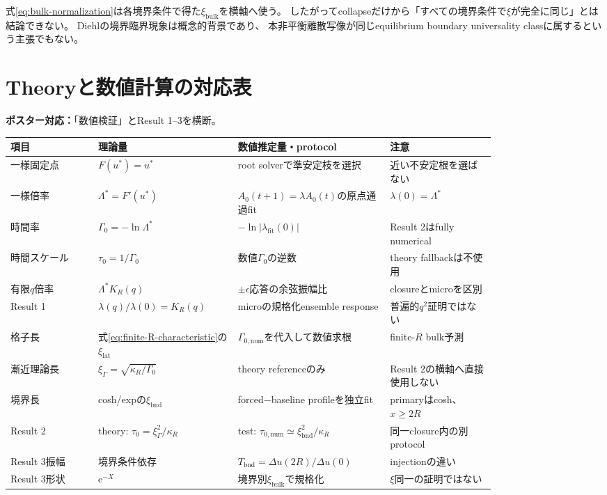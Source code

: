 \documentclass[a4paper,12pt]{ltjsarticle}
\newcommand{\PosterMap}[1]{%
  \begin{tcolorbox}[enhanced,boxrule=0pt,arc=1mm,colback=softgray,
    left=2mm,right=2mm,top=1mm,bottom=1mm,before skip=0pt,after skip=0.7em]
  \normalsize\textbf{ポスター対応：}#1
  \end{tcolorbox}}
\newcommand{\Caution}[1]{%
  \begin{tcolorbox}[enhanced,breakable,colback=softblue,colframe=navy,
    boxrule=0.6pt,arc=1.2mm,left=3mm,right=3mm,top=2mm,bottom=2mm,
    title=主張の範囲,fonttitle=\bfseries]
  #1
  \end{tcolorbox}}
\newcommand{\e}{\mathrm e}
\newcommand{\bnd}{\mathrm{bnd}}
\newcommand{\bulk}{\mathrm{bulk}}
\begin{document}
\Caution{
  式\eqref{eq:bulk-normalization}は各境界条件で得た$\xi_{\bulk}$を横軸へ使う。
  したがってcollapseだけから「すべての境界条件で$\xi$が完全に同じ」とは結論できない。
  Diehlの境界臨界現象\cite{diehl1997}は概念的背景であり、
  本非平衡離散写像が同じequilibrium boundary universality classに属するという主張でもない。
}

\section{Theoryと数値計算の対応表}\label{sec:correspondence}
\PosterMap{「数値検証」とResult 1--3を横断。}

\begin{longtable}{p{0.15\linewidth}p{0.22\linewidth}p{0.26\linewidth}p{0.18\linewidth}}
\toprule
項目 & 理論量 & 数値推定量・protocol & 注意 \\
\midrule
\endhead
一様固定点 & $F(u^*)=u^*$ & root solverで準安定枝を選択 & 近い不安定根を選ばない \\
一様倍率 & $\Lambda^*=F'(u^*)$ & $A_0(t+1)=\lambda A_0(t)$の原点通過fit & $\lambda(0)=\Lambda^*$ \\
時間率 & $\Gamma_0=-\ln\Lambda^*$ & $-\ln|\lambda_{\mathrm{fit}}(0)|$ & Result 2はfully numerical \\
時間スケール & $\tau_0=1/\Gamma_0$ & 数値$\Gamma_0$の逆数 & theory fallbackは不使用 \\
有限$q$倍率 & $\Lambda^*K_R(q)$ & $\pm\epsilon$応答の余弦振幅比 & closureとmicroを区別 \\
Result 1 & $\lambda(q)/\lambda(0)=K_R(q)$ & microの規格化ensemble response & 普遍的$q^2$証明ではない \\
格子長 & 式\eqref{eq:finite-R-characteristic}の$\xi_{\mathrm{lat}}$ & $\Gamma_{0,\mathrm{num}}$を代入して数値求根 & finite-$R$ bulk予測 \\
漸近理論長 & $\xi_{\Gamma}=\sqrt{\kappa_R/\Gamma_0}$ & theory referenceのみ & Result 2の横軸へ直接使用しない \\
境界長 & cosh/expの$\xi_{\bnd}$ & forced$-$baseline profileを独立fit & primaryはcosh、$x\ge2R$ \\
Result 2 & theory: $\tau_0=\xi_{\Gamma}^2/\kappa_R$ & test: $\tau_{0,\mathrm{num}}\simeq\xi_{\bnd}^2/\kappa_R$ & 同一closure内の別protocol \\
Result 3振幅 & 境界条件依存 & $T_{\bnd}=\Delta u(2R)/\Delta u(0)$ & injectionの違い \\
Result 3形状 & $\e^{-X}$ & 境界別$\xi_{\bulk}$で規格化 & $\xi$同一の証明ではない \\
\bottomrule
\end{longtable}
\end{document}
